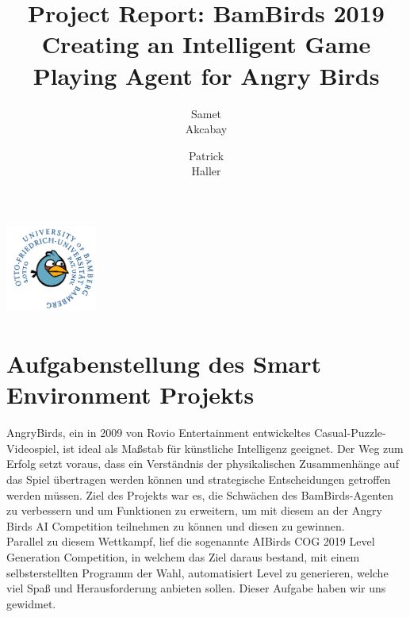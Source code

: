 \documentclass[11pt]{article}
\begin{document}
	\begin{titlepage}
		\begin{center}
			\title{Project Report: BamBirds 2019\\
				{\small Creating  an Intelligent Game Playing Agent for Angry Birds}}
			\includegraphics[width=3cm,height=3cm]{img/logo.png}
			\author{Samet\\Akcabay\and
			Patrick\\Haller}
		\end{center}
	\end{titlepage}
\maketitle
\newpage
\tableofcontents
\newpage
\section{Aufgabenstellung des Smart Environment Projekts}
AngryBirds, ein in 2009 von Rovio Entertainment entwickeltes Casual-Puzzle-Videospiel, ist ideal als Maßstab für künstliche Intelligenz geeignet. Der Weg zum Erfolg setzt voraus, dass ein Verständnis der physikalischen Zusammenhänge auf das Spiel übertragen werden können und strategische Entscheidungen getroffen werden müssen. Ziel des Projekts war es, die Schwächen des BamBirds-Agenten zu verbessern und um Funktionen zu erweitern, um mit diesem an der Angry Birds AI Competition teilnehmen zu können und diesen zu gewinnen.\\Parallel zu diesem Wettkampf, lief die sogenannte AIBirds COG 2019 Level Generation Competition, in welchem das Ziel daraus bestand, mit einem selbsterstellten Programm der Wahl, automatisiert Level zu generieren, welche viel Spaß und Herausforderung anbieten sollen. Dieser Aufgabe haben wir uns gewidmet.
\end{document}
